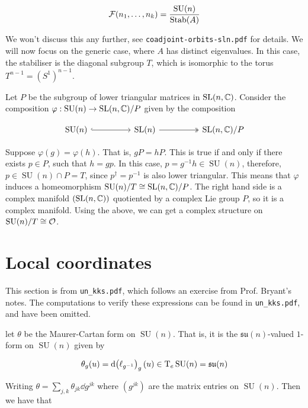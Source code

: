 \documentclass{article}
\DeclareMathOperator{\SU}{SU}
\newcommand{\su}{\mathfrak{su}}
\begin{document}
\[\mcF(n_1, \dots, n_k) = \frac{\SU(n)}{\Stab(A)}\]

We won't discuss this any further, see \texttt{coadjoint-orbits-sln.pdf} for details. We will now focus on the generic case, where \(A\) has distinct eigenvalues. In this case, the stabiliser is the diagonal subgroup \(T\), which is isomorphic to the torus \(T^{n-1} = (S^1)^{n-1}\).

Let \(P\) be the subgroup of lower triangular matrices in \(\operatorname{SL}(n, \mathbb{C})\). Consider the composition \(\varphi : \SU(n) \to \SL(n, \C)/P\) given by the composition 

\[\begin{tikzcd}
	{\SU(n)} && {\SL(n)} && {\SL(n, \C)/P}
	\arrow[hook, from=1-1, to=1-3]
	\arrow[two heads, from=1-3, to=1-5]
\end{tikzcd}\]

Suppose \(\varphi(g) = \varphi(h)\). That is, \(gP = hP\). This is true if and only if there exists \(p \in P\), such that \(h = gp\). In this case, \(p = g^{-1}h \in \SU(n)\), therefore, \(p \in \SU(n) \cap P = T\), since \(p^\dagger = p^{-1}\) is also lower triangular. This means that \(\varphi\) induces a homeomorphism \(\SU(n)/T \cong \SL(n, \C)/P\). The right hand side is a complex manifold \((\operatorname{SL}(n, \mathbb{C}))\) quotiented by a complex Lie group \(P\), so it is a complex manifold. Using the above, we can get a complex structure on \(\SU(n)/T \cong \mcO\).

\section{Local coordinates}

This section is from \texttt{un\_kks.pdf}, which follows an exercise from Prof. Bryant's notes. The computations to verify these expressions can be found in \texttt{un\_kks.pdf}, and have been omitted.

let \(\theta\) be the Maurer-Cartan form on \(\SU(n)\). That is, it is the \(\su(n)\)-valued \(1\)-form on \(\SU(n)\) given by

\[\theta_g(u) = \dd (\ell_{g^{-1}})_g(u) \in \TT_e\SU(n) = \su(n)\]

Writing \(\theta = \sum_{j, k}\theta_{jk}\dd g^{jk}\) where \((g^{jk})\) are the matrix entries on \(\SU(n)\). Then we have that
\end{document}
